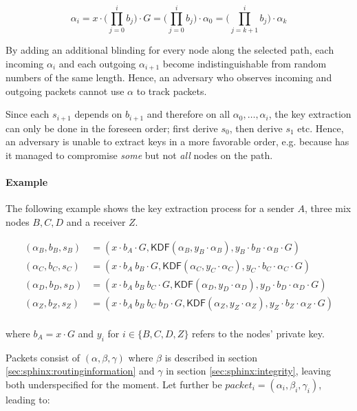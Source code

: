 $$ \alpha_i = x \cdot \biggl(\prod_{j=0}^{i} b_j \biggr) \cdot G = \biggl(\prod_{j=0}^{i} b_j \biggr) \cdot \alpha_0 = \biggl(\prod_{j=k+1}^{i} b_j \biggr) \cdot \alpha_k $$

By adding an additional blinding for every node along the selected path, each incoming $\alpha_i$ and each outgoing $\alpha_{i+1}$ become indistinguishable from random numbers of the same length. Hence, an adversary who observes incoming and outgoing packets cannot use $\alpha$ to track packets.

Since each $s_{i+1}$ depends on $b_{i+1}$ and therefore on all $\alpha_0, \dots , \alpha_i$, the key extraction can only be done in the foreseen order; first derive $s_0$, then derive $s_1$ etc. Hence, an adversary is unable to extract keys in a more favorable order, e.g. because has it managed to compromise \textit{some} but not \textit{all} nodes on the path.

\paragraph{Example}

The following example shows the key extraction process for a sender $A$, three mix nodes $B,C,D$ and a receiver $Z$.

\begin{align*}
    (\alpha_B,b_B,s_B) & = (x \cdot b_A \cdot G,\textsf{KDF}(\alpha_B,y_B \cdot \alpha_B), y_B \cdot b_B \cdot \alpha_B \cdot G )                   \\
    (\alpha_C,b_C,s_C) & = (x \cdot b_A \ b_B \cdot G,\textsf{KDF}(\alpha_C,y_C \cdot \alpha_C), y_C \cdot b_C \cdot \alpha_C \cdot G )             \\
    (\alpha_D,b_D,s_D) & = (x \cdot b_A \ b_B \ b_C \cdot G,\textsf{KDF}(\alpha_D,y_D \cdot \alpha_D), y_D \cdot b_D \cdot \alpha_D \cdot G )       \\
    (\alpha_Z,b_Z,s_Z) & = (x \cdot b_A \ b_B \ b_C \ b_D \cdot G,\textsf{KDF}(\alpha_Z,y_Z \cdot \alpha_Z), y_Z \cdot b_Z \cdot \alpha_Z \cdot G ) \\
\end{align*}

where $b_A = x \cdot G$ and $y_i$ for $i \in \{ B,C,D,Z \}$ refers to the nodes' private key.

Packets consist of $(\alpha, \beta, \gamma)$ where $\beta$ is described in section \ref{sec:sphinx:routinginformation} and $\gamma$ in section \ref{sec:sphinx:integrity}, leaving both underspecified for the moment. Let further be $packet_i = (\alpha_i, \beta_i, \gamma_i)$, leading to:

